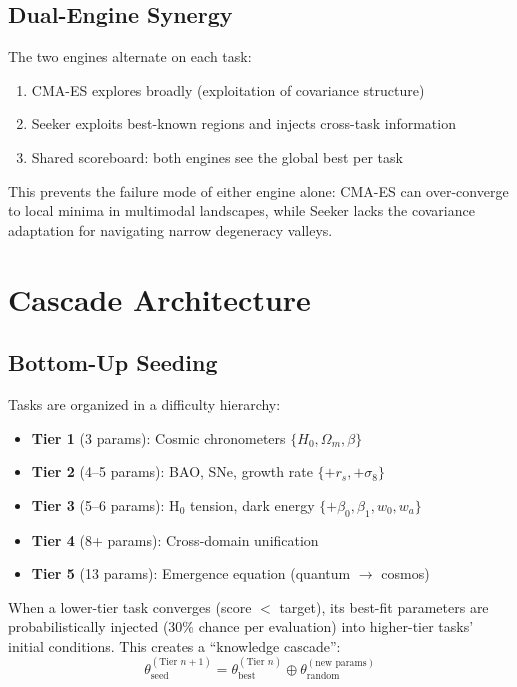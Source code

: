\documentclass[twocolumn,showpacs,preprintnumbers,amsmath,amssymb,prl]{revtex4-2}
\begin{document}
\subsection{Dual-Engine Synergy}

The two engines alternate on each task:
\begin{enumerate}
\item CMA-ES explores broadly (exploitation of covariance structure)
\item Seeker exploits best-known regions and injects cross-task information
\item Shared scoreboard: both engines see the global best per task
\end{enumerate}

This prevents the failure mode of either engine alone: CMA-ES can over-converge to local minima in multimodal landscapes, while Seeker lacks the covariance adaptation for navigating narrow degeneracy valleys.

\section{Cascade Architecture}

\subsection{Bottom-Up Seeding}

Tasks are organized in a difficulty hierarchy:
\begin{itemize}
\item \textbf{Tier 1} (3 params): Cosmic chronometers $\{H_0, \Omega_m, \beta\}$
\item \textbf{Tier 2} (4--5 params): BAO, SNe, growth rate $\{+r_s, +\sigma_8\}$
\item \textbf{Tier 3} (5--6 params): H$_0$ tension, dark energy $\{+\beta_0, \beta_1, w_0, w_a\}$
\item \textbf{Tier 4} (8+ params): Cross-domain unification
\item \textbf{Tier 5} (13 params): Emergence equation (quantum $\to$ cosmos)
\end{itemize}

When a lower-tier task converges (score $< $ target), its best-fit parameters are probabilistically injected (30\% chance per evaluation) into higher-tier tasks' initial conditions. This creates a ``knowledge cascade'':
\begin{equation}
\theta^{(\text{Tier } n+1)}_{\text{seed}} = \theta^{(\text{Tier } n)}_{\text{best}} \oplus \theta_{\text{random}}^{(\text{new params})}
\end{equation}
\end{document}
